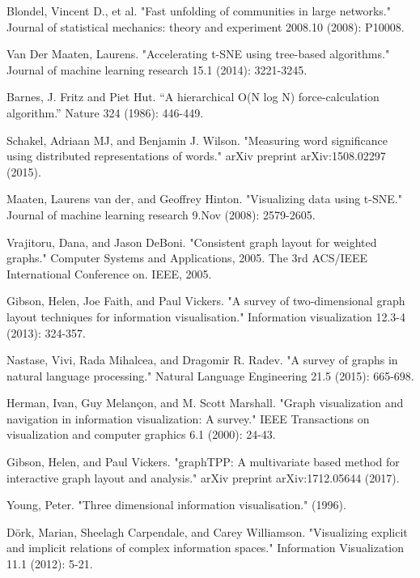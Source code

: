 \begin{thebibliography}{99}

 Blondel, Vincent D., et al. "Fast unfolding of communities in large networks." Journal of statistical mechanics: theory and experiment 2008.10 (2008): P10008.

 Van Der Maaten, Laurens. "Accelerating t-SNE using tree-based algorithms." Journal of machine learning research 15.1 (2014): 3221-3245.

 Barnes, J. Fritz and Piet Hut. “A hierarchical O(N log N) force-calculation algorithm.” Nature 324 (1986): 446-449.

 Schakel, Adriaan MJ, and Benjamin J. Wilson. "Measuring word significance using distributed representations of words." arXiv preprint arXiv:1508.02297 (2015).

 Maaten, Laurens van der, and Geoffrey Hinton. "Visualizing data using t-SNE." Journal of machine learning research 9.Nov (2008): 2579-2605.

 Vrajitoru, Dana, and Jason DeBoni. "Consistent graph layout for weighted graphs." Computer Systems and Applications, 2005. The 3rd ACS/IEEE International Conference on. IEEE, 2005.

 Gibson, Helen, Joe Faith, and Paul Vickers. "A survey of two-dimensional graph layout techniques for information visualisation." Information visualization 12.3-4 (2013): 324-357.

 Nastase, Vivi, Rada Mihalcea, and Dragomir R. Radev. "A survey of graphs in natural language processing." Natural Language Engineering 21.5 (2015): 665-698.

 Herman, Ivan, Guy Melançon, and M. Scott Marshall. "Graph visualization and navigation in information visualization: A survey." IEEE Transactions on visualization and computer graphics 6.1 (2000): 24-43.

 Gibson, Helen, and Paul Vickers. "graphTPP: A multivariate based method for interactive graph layout and analysis." arXiv preprint arXiv:1712.05644 (2017).

 Young, Peter. "Three dimensional information visualisation." (1996).

 Dörk, Marian, Sheelagh Carpendale, and Carey Williamson. "Visualizing explicit and implicit relations of complex information spaces." Information Visualization 11.1 (2012): 5-21.


\end{thebibliography}

